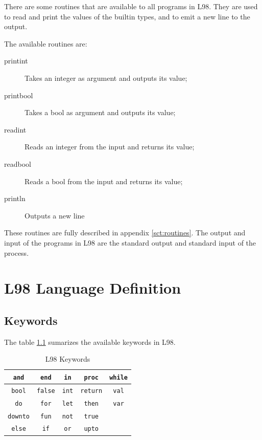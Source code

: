 \documentclass[a4paper, 11pt]{report}
\newcommand{\keyword}[1]{\texttt{#1}}
\begin{document}
There are some routines that are available to all programs in L98. They are used
to read and print the values of the builtin types, and to emit a new line to the output.

The available routines are:

\begin{description}
\item[printint] Takes an integer as argument and outputs its value;

\item[printbool] Takes a bool as argument and outputs its value;

\item[readint] Reads an integer from the input and returns its value;

\item[readbool] Reads a bool from the input and returns its value;

\item[println] Outputs a new line
\end{description}

These routines are fully described in appendix \ref{sct:routines}.
The output and input of the programs in L98 are the standard output and
standard input of the process.

\appendix

\chapter{L98 Language Definition}
\section{Keywords}
The table \ref{tbl:keys} sumarizes the available keywords in L98.

\begin{table}[htb]
\center
\begin{tabular}{|c|c|c|c|c|}
 \hline
 \keyword{and} & \keyword{end} & \keyword{in} & \keyword{proc} & \keyword{while}\\
 \hline
 \keyword{bool} & \keyword{false} & \keyword{int} & \keyword{return} & \keyword{val}\\
 \hline
 \keyword{do} & \keyword{for} & \keyword{let} & \keyword{then} & \keyword{var}\\
 \hline
 \keyword{downto} & \keyword{fun} & \keyword{not} & \keyword{true} &\\
 \hline
 \keyword{else} & \keyword{if} & \keyword{or} & \keyword{upto} &\\
 \hline
\end{tabular}
\caption{L98 Keywords}
\label{tbl:keys}
\end{table}
\end{document}
